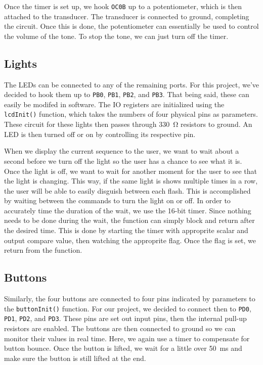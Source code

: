 \documentclass{article}
\begin{document}
    Once the timer is set up, we hook \verb|OC0B| up to a potentiometer, which is then attached to the transducer. The transducer is connected to ground, completing the circuit. Once this is done, the potentiometer can essentially be used to control the volume of the tone. To stop the tone, we can just turn off the timer.

    \subsection{Lights}
    
    The LEDs can be connected to any of the remaining ports. For this project, we've decided to hook them up to \verb|PB0|, \verb|PB1|, \verb|PB2|, and \verb|PB3|. That being said, these can easily be modifed in software. The IO registers are initialized using the \verb|lcdInit()| function, which takes the numbers of four physical pins as parameters. These circuit for these lights then passes through \SI{330}{\ohm} resistors to ground. An LED is then turned off or on by controlling its respective pin.
    
    When we display the current sequence to the user, we want to wait about a second before we turn off the light so the user has a chance to see what it is. Once the light is off, we want to wait for another moment for the user to see that the light is changing. This way, if the same light is shows multiple times in a row, the user will be able to easily disguish between each flash. This is accomplished by waiting between the commands to turn the light on or off. In order to accurately time the duration of the wait, we use the 16-bit timer. Since nothing needs to be done during the wait, the function can simply block and return after the desired time. This is done by starting the timer with approprite scalar and output compare value, then watching the approprite flag. Once the flag is set, we return from the function.
    
    \subsection{Buttons}
    
    Similarly, the four buttons are connected to four pins indicated by parameters to the \verb|buttonInit()| function. For our project, we decided to connect then to \verb|PD0|, \verb|PD1|, \verb|PD2|, and \verb|PD3|. These pins are set out input pins, then the internal pull-up resistors are enabled. The buttons are then connected to ground so we can monitor their values in real time. Here, we again use a timer to compensate for button bounce. Once the button is lifted, we wait for a little over \SI{50}{\milli\second} and make sure the button is still lifted at the end.  
    
\end{document}
